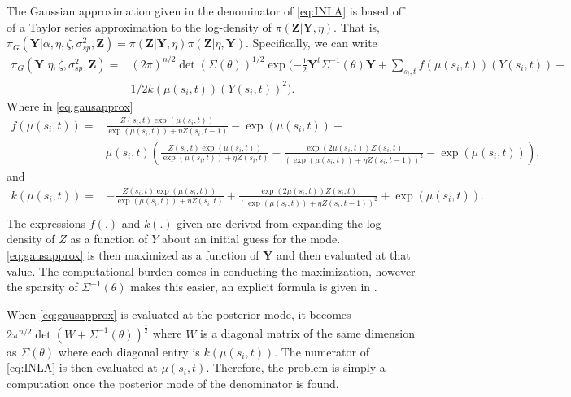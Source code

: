 \documentclass[11pt]{isuthesis}
\begin{document}
	The Gaussian approximation given in the denominator of \eqref{eq:INLA} is based off of a Taylor series approximation to the log-density of $\pi(\boldsymbol{Z}|\boldsymbol{Y},\eta)$.  That is, $\pi_G(\boldsymbol{Y}|\alpha,\eta,\zeta,\sigma_{sp}^2,\boldsymbol{Z})=\pi(\boldsymbol{Z}|\boldsymbol{Y},\eta)\pi(\boldsymbol{Z}|\eta,\boldsymbol{Y})$.  Specifically, we can write 
	\begin{align}
	\pi_G(\boldsymbol{Y}|\eta,\zeta,\sigma_{sp}^2,\boldsymbol{Z}) =& (2 \pi)^{n/2} \det(\Sigma(\theta))^{1/2} \exp(-\frac{1}{2}\boldsymbol{Y}^t \Sigma^{-1}(\theta)\boldsymbol{Y}+\sum_{s_i,t} f(\mu(s_i,t))(Y(s_i,t))+ \nonumber 
	\\ \label{eq:gausapprox}& 1/2 k (\mu(s_i,t))(Y(s_i,t))^2).
	\end{align} 
	Where in \eqref{eq:gausapprox}
	{\small
	\begin{align}
	f(\mu(s_i,t))  =& \frac{Z(s_i,t)\exp(\mu(s_i,t))}{\exp(\mu(s_i,t))+\eta Z(s_i,t-1)}-\exp(\mu(s_i,t)) - \nonumber \\       & \mu(s_i,t)\left(\frac{Z(s_i,t)\exp(\mu(s_i,t))}{\exp(\mu(s_i,t))+\eta Z(s_i,t)}-\frac{\exp(2 \mu(s_i,t))Z(s_i,t)}{\left(\exp(\mu(s_i,t))+\eta Z(s_i,t-1)\right)^2}-\exp(\mu(s_i,t))\right),
	\end{align}
	}%
	and
	\begin{align}
	k(\mu(s_i,t)) =& -\frac{Z(s_i,t)\exp(\mu(s_i,t))}{\exp(\mu(s_i,t))+\eta Z(s_i,t)}+\frac{\exp(2 \mu(s_i,t))Z(s_i,t)}{\left(\exp(\mu(s_i,t))+\eta Z(s_i,t-1)\right)^2}+\exp(\mu(s_i,t)). \\ 
	\end{align}
	The expressions $f(.)$ and $k(.)$ given are derived from expanding the log-density of $Z$ as a function of $Y$ about an initial guess for the mode. \eqref{eq:gausapprox} is then maximized as a function of $\boldsymbol{Y}$ and then evaluated at that value.  The computational burden comes in conducting the maximization, however the sparsity of $\Sigma^{-1}(\theta)$ makes this easier, an explicit formula is given in \cite{rue2009approximate}.  
	
	When \eqref{eq:gausapprox} is evaluated at the posterior mode, it becomes $2 \pi^{n/2} \det (W+\Sigma^{-1}(\theta))^{\frac{1}{2}}$ where $W$ is a diagonal matrix of the same dimension as $\Sigma(\theta)$ where each diagonal entry is $k(\mu(s_i,t))$.  The numerator of \eqref{eq:INLA} is then evaluated at $\mu(s_i,t)$.  Therefore, the problem is simply a computation once the posterior mode of the denominator is found.
	
\end{document}
